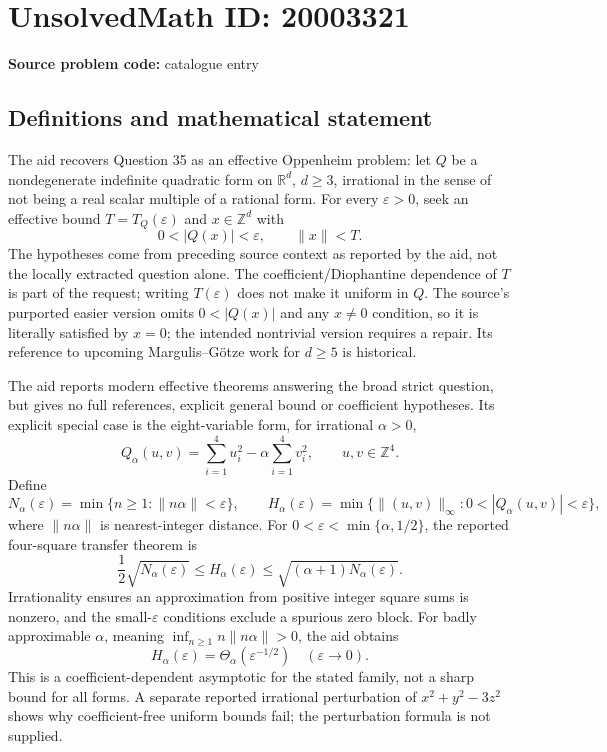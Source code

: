 \documentclass[11pt]{article}
\newcommand{\Z}{\mathbb{Z}}
\newcommand{\R}{\mathbb{R}}
\begin{document}
\section*{UnsolvedMath ID: 20003321}
\textbf{Source problem code:} catalogue entry
\subsection{Definitions and mathematical statement}
The aid recovers Question 35 as an effective Oppenheim problem: let $Q$ be a nondegenerate indefinite quadratic form on $\R^d$, $d\geq3$, irrational in the sense of not being a real scalar multiple of a rational form. For every $\varepsilon>0$, seek an effective bound $T=T_Q(\varepsilon)$ and $x\in\Z^d$ with
\[
 0<|Q(x)|<\varepsilon,\qquad\|x\|<T.
\]
The hypotheses come from preceding source context as reported by the aid, not the locally extracted question alone. The coefficient/Diophantine dependence of $T$ is part of the request; writing $T(\varepsilon)$ does not make it uniform in $Q$. The source's purported easier version omits $0<|Q(x)|$ and any $x\ne0$ condition, so it is literally satisfied by $x=0$; the intended nontrivial version requires a repair. Its reference to upcoming Margulis--G\"otze work for $d\geq5$ is historical.

The aid reports modern effective theorems answering the broad strict question, but gives no full references, explicit general bound or coefficient hypotheses. Its explicit special case is the eight-variable form, for irrational $\alpha>0$,
\[
 Q_\alpha(u,v)=\sum_{i=1}^4u_i^2-\alpha\sum_{i=1}^4v_i^2,
 \qquad u,v\in\Z^4.
\]
Define
\[
 N_\alpha(\varepsilon)=\min\{n\geq1:\|n\alpha\|<\varepsilon\},
 \qquad
 H_\alpha(\varepsilon)=\min\{\|(u,v)\|_\infty:
                  0<|Q_\alpha(u,v)|<\varepsilon\},
\]
where $\|n\alpha\|$ is nearest-integer distance. For $0<\varepsilon<\min\{\alpha,1/2\}$, the reported four-square transfer theorem is
\[
 \frac12\sqrt{N_\alpha(\varepsilon)}
 \leq H_\alpha(\varepsilon)
 \leq\sqrt{(\alpha+1)N_\alpha(\varepsilon)}.
\]
Irrationality ensures an approximation from positive integer square sums is nonzero, and the small-$\varepsilon$ conditions exclude a spurious zero block. For badly approximable $\alpha$, meaning $\inf_{n\geq1}n\|n\alpha\|>0$, the aid obtains
\[
 H_\alpha(\varepsilon)=\Theta_\alpha(\varepsilon^{-1/2})
 \quad(\varepsilon\to0).
\]
This is a coefficient-dependent asymptotic for the stated family, not a sharp bound for all forms. A separate reported irrational perturbation of $x^2+y^2-3z^2$ shows why coefficient-free uniform bounds fail; the perturbation formula is not supplied.
\end{document}
